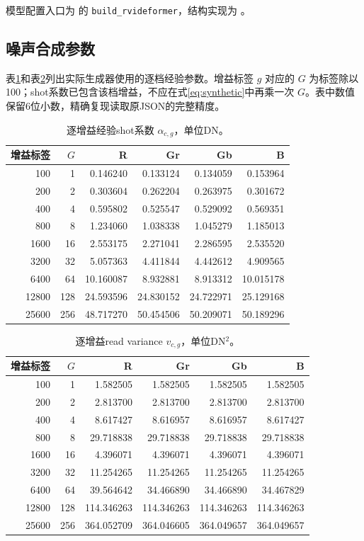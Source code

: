 \documentclass[11pt,a4paper,UTF8,fontset=fandol]{ctexart}
\begin{document}
模型配置入口为  的 \texttt{build\_rvideformer}，结构实现为 。

\subsection{噪声合成参数}

表\ref{tab:shot}和表\ref{tab:read}列出实际生成器使用的逐档经验参数。增益标签 $g$ 对应的 $G$ 为标签除以100；shot系数已包含该档增益，不应在式\eqref{eq:synthetic}中再乘一次 $G$。表中数值保留6位小数，精确复现读取原JSON的完整精度。

\begin{table}[!htbp]
\centering\small
\caption{逐增益经验shot系数 $\alpha_{c,g}$，单位DN。}
\label{tab:shot}
\begin{tabular}{rrrrrr}
\toprule
增益标签 & $G$ & R & Gr & Gb & B \\
\midrule
100 & 1 & 0.146240 & 0.133124 & 0.134059 & 0.153964 \\
200 & 2 & 0.303604 & 0.262204 & 0.263975 & 0.301672 \\
400 & 4 & 0.595802 & 0.525547 & 0.529092 & 0.569351 \\
800 & 8 & 1.234060 & 1.038338 & 1.045279 & 1.185013 \\
1600 & 16 & 2.553175 & 2.271041 & 2.286595 & 2.535520 \\
3200 & 32 & 5.057363 & 4.411844 & 4.442612 & 4.909565 \\
6400 & 64 & 10.160087 & 8.932881 & 8.913312 & 10.015178 \\
12800 & 128 & 24.593596 & 24.830152 & 24.722971 & 25.129168 \\
25600 & 256 & 48.717270 & 50.454506 & 50.209071 & 50.189296 \\
\bottomrule
\end{tabular}
\end{table}

\begin{table}[!htbp]
\centering\small
\caption{逐增益read variance $v_{c,g}$，单位DN$^2$。}
\label{tab:read}
\begin{tabular}{rrrrrr}
\toprule
增益标签 & $G$ & R & Gr & Gb & B \\
\midrule
100 & 1 & 1.582505 & 1.582505 & 1.582505 & 1.582505 \\
200 & 2 & 2.813700 & 2.813700 & 2.813700 & 2.813700 \\
400 & 4 & 8.617427 & 8.616957 & 8.616957 & 8.617427 \\
800 & 8 & 29.718838 & 29.718838 & 29.718838 & 29.718838 \\
1600 & 16 & 4.396071 & 4.396071 & 4.396071 & 4.396071 \\
3200 & 32 & 11.254265 & 11.254265 & 11.254265 & 11.254265 \\
6400 & 64 & 39.564642 & 34.466890 & 34.466890 & 34.467829 \\
12800 & 128 & 114.346263 & 114.346263 & 114.346263 & 114.346263 \\
25600 & 256 & 364.052709 & 364.046605 & 364.049657 & 364.049657 \\
\bottomrule
\end{tabular}
\end{table}
\end{document}
